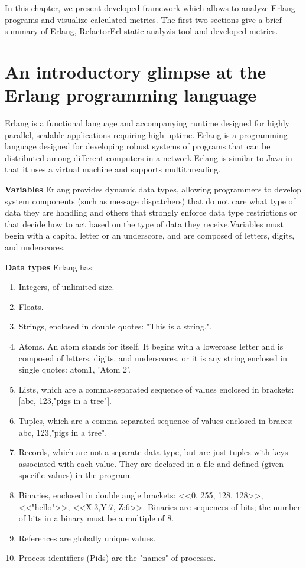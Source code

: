 In this chapter, we present developed framework which allows to analyze Erlang programs and visualize calculated metrics. The first two sections give a brief summary of Erlang, RefactorErl static analyzis tool and developed metrics.

\section{An introductory glimpse at the Erlang programming language}
Erlang is a functional language and accompanying runtime designed for highly
parallel, scalable applications requiring high uptime. Erlang is a programming
language designed for developing robust systems of programs that can be distributed among different computers in a network.Erlang is similar to Java in that it uses a virtual machine and supports multithreading. 

\textbf{Variables}
Erlang provides dynamic data types, allowing programmers to develop system
components (such as message dispatchers) that do not care what type of data they are handling and others that strongly enforce data type restrictions or that decide how to act based on the type of data they receive.Variables must begin with a capital letter or an underscore, and are composed of letters, digits, and underscores.

\textbf{Data types}
Erlang has:
\begin{enumerate}
	\item Integers, of unlimited size.
	\item Floats.
	\item Strings, enclosed in double quotes: "This is a string.".
	\item Atoms. An atom stands for itself. It begins with a lowercase letter and is composed of letters, digits, and underscores, or it is any string enclosed in single quotes: atom1, 'Atom 2'.
	\item Lists, which are a comma-separated sequence of values enclosed in brackets: [abc, 123,"pigs in a tree"]. 
	\item Tuples, which are a comma-separated sequence of values enclosed in braces: {abc, 123,"pigs in a tree"}.
	\item Records, which are not a separate data type, but are just tuples with keys associated with each value. They are declared in a file and defined (given specific values) in the program.
	\item Binaries, enclosed in double angle brackets: <<0, 255, 128, 128>>, <<"hello">>, <<X:3,Y:7, Z:6>>. Binaries are sequences of bits; the number of bits in a binary must be a multiple of 8.
	\item References are globally unique values.
	\item Process identifiers (Pids) are the "names" of processes.
\end{enumerate}

